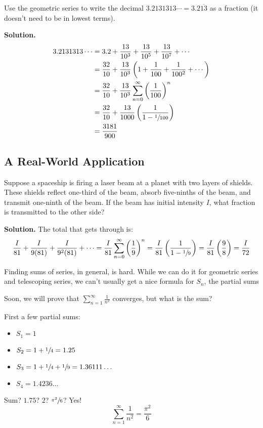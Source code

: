 \begin{Example}{}{}
    Use the geometric series to write the decimal
    $ 3.2131313\cdots=3.2\overline{13} $ as a fraction (it doesn't need to be in lowest terms).

    \textbf{Solution.}
    \begin{align*}
        3.2131313\cdots
         & =3.2+\frac{13}{10^3} +\frac{13}{10^5} +\frac{13}{10^7} +\cdots                            \\
         & =\frac{32}{10} +\frac{13}{10^3} \left( 1+\frac{1}{100} +\frac{1}{100^2}+\cdots  \right)   \\
         & =\frac{32}{10} +\frac{13}{10^3} \sum\limits_{n=0}^{\infty} \left( \frac{1}{100} \right)^n \\
         & =\frac{32}{10} +\frac{13}{1000} \left( \frac{1}{1-\sfrac{1}{100} } \right)                \\
         & =\frac{3181}{900}
    \end{align*}
\end{Example}

\subsection*{A Real-World Application}
Suppose a spaceship is firing a laser beam at a planet with two layers of shields. These shields reflect
one-third of the beam, absorb five-ninths of the beam, and transmit one-ninth of the beam.
If the beam has initial intensity $ I $, what fraction is transmitted to the other side?

\textbf{Solution.} The total that gets through is:
\[
    \frac{I}{81} +\frac{I}{9(81)} +\frac{I}{9^2(81)} +\cdots
    =\frac{I}{81} \sum\limits_{n=0}^{\infty} \left( \frac{1}{9}  \right)^n
    =\frac{I}{81} \left( \frac{1}{1-\sfrac{1}{9}}  \right)
    =\frac{I}{81} \left( \frac{9}{8}  \right)
    =\frac{I}{72}
\]

Finding sums of series, in general, is hard. While we can do it for geometric
series and telescoping series, we can't usually get a nice formula for $ S_n $,
the partial sums

Soon, we will prove that $ \displaystyle \sum\limits_{n=1}^{\infty} \frac{1}{n^2}  $ converges,
but what is the sum?

First a few partial sums:
\begin{itemize}
    \item $ S_1=1 $
    \item $ S_2=1+\sfrac{1}{4} =1.25 $
    \item $ S_3=1+\sfrac{1}{4} +\sfrac{1}{9} =1.36111\ldots $
    \item $ S_4=1.4236\ldots $
\end{itemize}
Sum? $ 1.75 $? $ 2 $? $ \sfrac{\pi^2}{6} $? Yes!
\[ \boxed{\sum\limits_{n=1}^{\infty} \frac{1}{n^2} =\frac{\pi^2}{6}} \]

